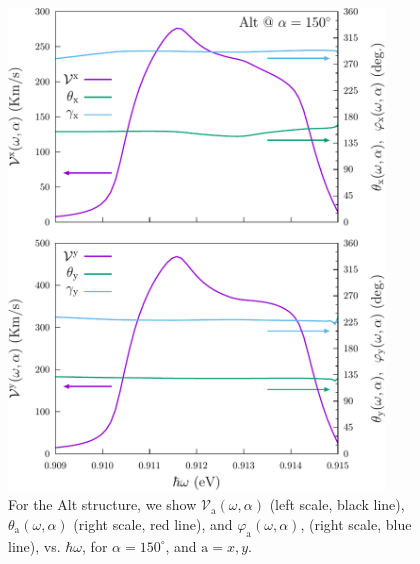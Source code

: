\documentclass[floatfix,prb,aps,superscriptaddress,showpacs,11pt,preprint,letterpaper]{revtex4}
\def\tama{10cm}
\begin{document}
\begin{figure}[tb]
\centering
\includegraphics[width=\tama]{figures/fig10}
\caption{For the Alt structure, we show $\mathcal{V}_{\mathrm{a}}
(\omega,\alpha)$ (left scale, black line), $\theta_{\mathrm{a}} (\omega,\alpha)$
(right scale, red line), and $\varphi_{\mathrm{a}} (\omega,\alpha)$, (right
scale, blue line), vs. $\hbar\omega$, for $\alpha=150^\circ$, and $\mathrm{a} =
x,y$. }
\label{fig:alt-vx-vy-w2}
\end{figure}
\end{document}
